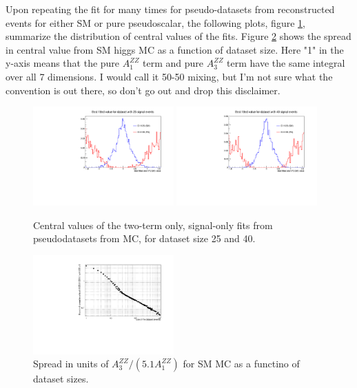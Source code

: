 \documentclass{cmspaper}
\begin{document}
Upon repeating the fit for many times for pseudo-datasets from reconstructed
events for either SM or pure pseudoscalar, the following plots, figure
\ref{fig:A1A3FitCentralValueDistribution}, summarize the
distribution of central values of the fits.  Figure
\ref{fig:A1A3FitSpread} shows the spread in central value from SM higgs MC as
a function of dataset size.  Here "1" in the y-axis means that the pure
$A_1^{ZZ}$ term and pure $A_3^{ZZ}$ term have the same integral over all
7 dimensions.  I would call it 50-50 mixing, but I'm not sure what the
convention is out there, so don't go out and drop this disclaimer.

\begin{figure}[htb!]
  \begin{center}
    \includegraphics[width=0.48\textwidth]{figures/A1A3Fit_A3ZZA1ZZComparison_25.pdf}
    \includegraphics[width=0.48\textwidth]{figures/A1A3Fit_A3ZZA1ZZComparison_40.pdf}
    \caption{Central values of the two-term only, signal-only fits from
    pseudodatasets from MC, for dataset size 25 and 40.}
    \label{fig:A1A3FitCentralValueDistribution}
  \end{center}
\end{figure}

\begin{figure}[htb!]
  \begin{center}
    \includegraphics[width=0.48\textwidth]{figures/A1A3Fit_ExpectedSpread.pdf}
    \caption{Spread in units of $A_3^{ZZ}/(5.1 A_1^{ZZ})$ for SM MC as a
    functino of dataset sizes.}
    \label{fig:A1A3FitSpread}
  \end{center}
\end{figure}
\end{document}
